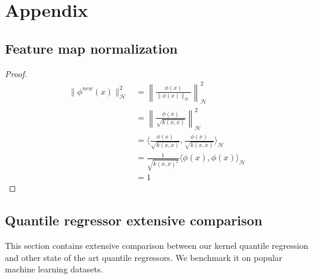 \chapter{Appendix}
\section{Feature map normalization}\label{appendix:new_feature}
\begin{proof}
\begin{align*}
    \|
    \phi^{new}(x)\|_{\mathcal{H}}^{2} &= \left\|\frac{\phi(x)}{\|\phi(x)\|_{\mathcal{H}}}
    \right\|_{\mathcal{H}}^{2}
    \\
    &=
    \left\|
    \frac{\phi(x)}
    {\sqrt{k(x,x)}}
    \right\|_{\mathcal{H}}^{2}
    \\
    &=
    \langle
    \frac{\phi(x)}
    {\sqrt{k(x,x)}}
    ,
    \frac{\phi(x)}
    {\sqrt{k(x,x)}}
    \rangle_{\mathcal{H}}
    \\
    &=
    \frac{1}{\sqrt{k(x,x)^{2}}}
    \langle
    \phi(x)
    ,
    \phi(x)
    \rangle_{\mathcal{H}}
    \\
    &=1
\end{align*}
\end{proof}



\section{Quantile regressor extensive comparison}\label{appendix:quantile_regressor_extensive_comparison}
This section contains extensive comparison between our kernel quantile regression and other state of the art quantile regressors. We benchmark it on popular machine learning datasets.
